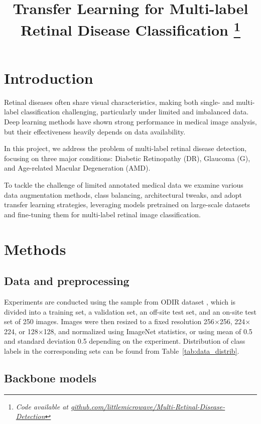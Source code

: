\documentclass{article}
\title{Transfer Learning for Multi-label Retinal Disease Classification \thanks{\textit{Code available at \url{github.com/littlemicrowave/Multi-Retinal-Disease-Detection}}}}
\begin{document}
%
\maketitle
%
\section{Introduction}
\label{sec:intro}

Retinal diseases often share visual characteristics, making both single- and multi-label classification challenging, particularly under limited and imbalanced data. Deep learning methods have shown strong performance in medical image analysis, but their effectiveness heavily depends on data availability.

In this project, we address the problem of multi-label retinal disease detection, focusing on three major conditions: Diabetic Retinopathy (DR), Glaucoma (G), and Age-related Macular Degeneration (AMD). 

To tackle the challenge of limited annotated medical data we examine various data augmentation methods, class balancing, architectural tweaks, and adopt transfer learning strategies, leveraging models pretrained on large-scale datasets and fine-tuning them for multi-label retinal image classification.

\section{Methods}

\subsection{Data and preprocessing}

Experiments are conducted using the sample from ODIR dataset  \cite{Li2020OcularBenchmark}, which is divided into a training set, a validation set, an off-site test set, and an on-site test set of 250 images. Images were then resized to a fixed resolution 256$\times$256, 224$\times$224, or 128$\times$128, and normalized using ImageNet \cite{Deng2009ImageNet} statistics, or using mean of 0.5 and standard deviation 0.5 depending on the experiment. Distribution of class labels in the corresponding sets can be found from Table~\ref{tab:data_distrib}.

\subsection{Backbone models}
\end{document}
